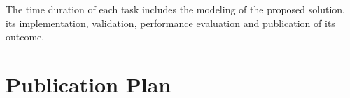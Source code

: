 


The time duration of each task includes the modeling of the proposed solution,  its implementation, validation, performance evaluation  and  publication of its outcome.

\section {Publication Plan} 